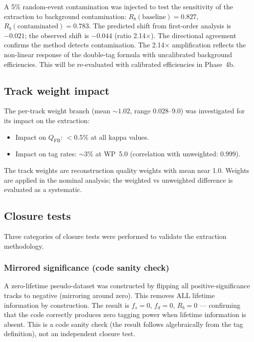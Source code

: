 \documentclass[11pt,a4paper]{article}
\begin{document}
A 5\% random-event contamination was injected to test the sensitivity of the
extraction to background contamination:
$R_b(\mathrm{baseline}) = 0.827$,
$R_b(\mathrm{contaminated}) = 0.783$.
The predicted shift from first-order analysis is $-0.021$; the observed shift is $-0.044$
(ratio 2.14$\times$). The directional agreement confirms the method detects contamination.
The 2.14$\times$ amplification reflects the non-linear response of the double-tag formula
with uncalibrated background efficiencies. This will be re-evaluated with calibrated
efficiencies in Phase~4b.

\subsection{Track weight impact}
\label{sec:xcheck_weights}

The per-track weight branch (mean $\sim 1.02$, range 0.028--9.0) was investigated for
its impact on the extraction:
\begin{itemize}
\item Impact on $Q_\mathrm{FB}$: $< 0.5\%$ at all kappa values.
\item Impact on tag rates: $\sim 3\%$ at WP~5.0 (correlation with unweighted: 0.999).
\end{itemize}
The track weights are reconstruction quality weights with mean near 1.0. Weights are
applied in the nominal analysis; the weighted vs unweighted difference is evaluated as
a systematic.

\subsection{Closure tests}
\label{sec:xcheck_closure}

Three categories of closure tests were performed to validate the extraction methodology.

\subsubsection{Mirrored significance (code sanity check)}

A zero-lifetime pseudo-dataset was constructed by flipping all positive-significance
tracks to negative (mirroring around zero). This removes ALL lifetime information by
construction. The result is $f_s = 0$, $f_d = 0$, $R_b = 0$ --- confirming that the
code correctly produces zero tagging power when lifetime information is absent. This is a
code sanity check (the result follows algebraically from the tag definition), not an
independent closure test.
\end{document}
